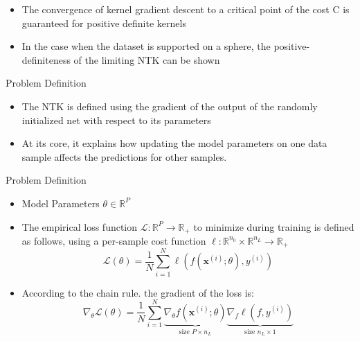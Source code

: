 \documentclass[serif, aspectratio=169]{beamer}
\begin{document}
\begin{frame}
\begin{itemize}
\item The convergence of kernel gradient descent to a critical point of the cost
C is guaranteed for positive definite kernels
\item In the case when the dataset is supported on a sphere, the
positive-definiteness of the limiting NTK can be shown
\end{itemize}
\end{frame}

\begin{frame}{Problem Definition}
	
	\begin{itemize}
		
		
		
		\item The NTK is defined using the gradient of the output of the randomly initialized net
		with respect to its parameters
		
		
		\item  At its core, it explains how updating the model parameters on one data sample affects the predictions for other samples.
	\end{itemize}
\end{frame}



\begin{frame}{Problem Definition}
	
	\begin{itemize}
		\item Model Parameters \(\theta \in \mathbb{R}^P\)
		
		\item The empirical loss function \(\mathcal{L}: \mathbb{R}^P \to \mathbb{R}_+\)
		to minimize during training is defined as follows, using a per-sample cost function \(\ell: \mathbb{R}^{n_0} \times \mathbb{R}^{n_L} \to \mathbb{R}_+\)
		\[
		\mathcal{L}(\theta) =\frac{1}{N} \sum_{i=1}^N \ell(f(\mathbf{x}^{(i)}; \theta), y^{(i)})
		\]
		\item  According to the chain rule. the gradient of the loss is:
		\[
		\nabla_\theta \mathcal{L}(\theta)= \frac{1}{N} \sum_{i=1}^N \underbrace{\nabla_\theta f(\mathbf{x}^{(i)}; \theta)}_{\text{size }P \times n_L} 
		\underbrace{\nabla_f \ell(f, y^{(i)})}_{\text{size } n_L \times 1}
		\]
		
	\end{itemize}
\end{frame}
\end{document}
